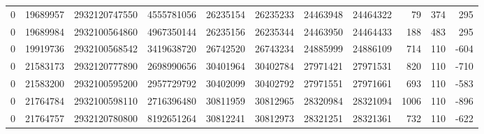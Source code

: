 \begin{tabular}{rrrrrrrrrrr}
0 & 19689957 & 2932120747550 & 4555781056 & 26235154 & 26235233 & 24463948 & 24464322 & 79 & 374 & 295 \\
0 & 19689984 & 2932100564860 & 4967350144 & 26235156 & 26235344 & 24463950 & 24464433 & 188 & 483 & 295 \\
0 & 19919736 & 2932100568542 & 3419638720 & 26742520 & 26743234 & 24885999 & 24886109 & 714 & 110 & -604 \\
0 & 21583173 & 2932120777890 & 2698990656 & 30401964 & 30402784 & 27971421 & 27971531 & 820 & 110 & -710 \\
0 & 21583200 & 2932100595200 & 2957729792 & 30402099 & 30402792 & 27971551 & 27971661 & 693 & 110 & -583 \\
0 & 21764784 & 2932100598110 & 2716396480 & 30811959 & 30812965 & 28320984 & 28321094 & 1006 & 110 & -896 \\
0 & 21764757 & 2932120780800 & 8192651264 & 30812241 & 30812973 & 28321251 & 28321361 & 732 & 110 & -622 \\
\bottomrule
\end{tabular}

